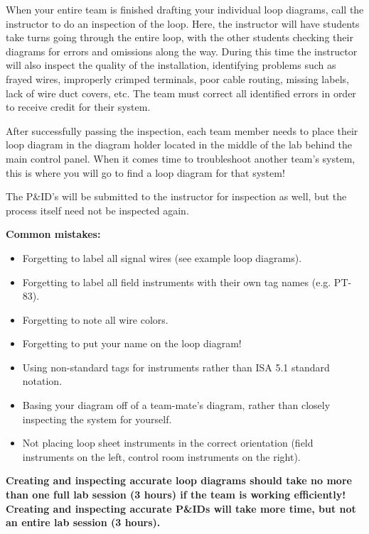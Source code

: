 \documentclass[12pt,a4paper]{article}
\begin{document}
When your entire team is finished drafting your individual loop diagrams, call the instructor to do an inspection of the loop.  Here, the instructor will have students take turns going through the entire loop, with the other students checking their diagrams for errors and omissions along the way.  During this time the instructor will also inspect the quality of the installation, identifying problems such as frayed wires, improperly crimped terminals, poor cable routing, missing labels, lack of wire duct covers, etc.  The team must correct all identified errors in order to receive credit for their system.  

After successfully passing the inspection, each team member needs to place their loop diagram in the diagram holder located in the middle of the lab behind the main control panel.  When it comes time to troubleshoot another team's system, this is where you will go to find a loop diagram for that system!

The P\&ID's will be submitted to the instructor for inspection as well, but the process itself need not be inspected again.

\vskip 10pt

{\bf Common mistakes:}

\begin{itemize}
\item{} Forgetting to label all signal wires (see example loop diagrams).
\item{} Forgetting to label all field instruments with their own tag names (e.g. PT-83).
\item{} Forgetting to note all wire colors.
\item{} Forgetting to put your name on the loop diagram!
\item{} Using non-standard tags for instruments rather than ISA 5.1 standard notation.
\item{} Basing your diagram off of a team-mate's diagram, rather than closely inspecting the system for yourself.
\item{} Not placing loop sheet instruments in the correct orientation (field instruments on the left, control room instruments on the right).
\end{itemize}

\vskip 10pt

{\bf Creating and inspecting accurate loop diagrams should take no more than one full lab session (3 hours) if the team is working efficiently!  Creating and inspecting accurate P\&IDs will take more time, but not an entire lab session (3 hours).}
\end{document}
